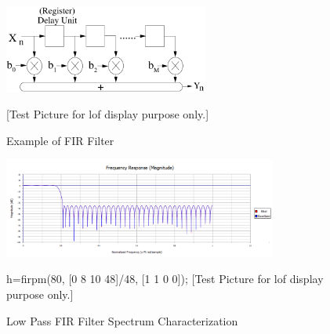 \begin{figure}[!hbp]
\begin{center}
\includegraphics[width=0.6\textwidth]{graphic/FIR_Implementation.pdf}
\caption{Example of FIR Filter}
\label{fig:genFIR}
[Test Picture for lof display purpose only.]
\end{center}
\end{figure}


\begin{figure}[!hbp]
\begin{center}
\includegraphics[width=0.8\textwidth]{graphic/LowPass_Filter_Design.PNG}
\caption{Low Pass FIR Filter Spectrum Characterization}
\label{fig:lowpass}
{\small h=firpm(80, [0 8 10 48]/48, [1 1 0 0]); [Test Picture for lof display purpose only.]}
\end{center}
\end{figure}

